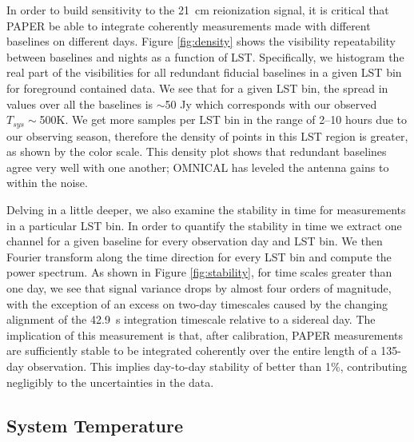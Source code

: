 \documentclass[twocolumn,numberedappendix]{emulateapj} \shorttitle{New Limits on the 21 cm Power Spectrum at $z=8.4$}
\begin{document}
In order to build sensitivity to the 21~cm reionization signal, it is critical
that PAPER be able to integrate coherently measurements made with different baselines on different days.
Figure \ref{fig:density} shows the visibility repeatability between 
baselines and nights as a function of LST. Specifically, we histogram the real part of
the visibilities for all redundant fiducial baselines 
in a given LST bin for foreground contained data. We see that for a
given LST bin, the spread in values over all the baselines is $\sim$50 Jy which corresponds with our observed
$T_{sys}\sim$500K.  We get
more samples per LST bin in the range of 2--10 hours due to our observing
season, therefore the density of points in this LST region is greater, as shown by
the color scale. This density plot shows that redundant baselines agree very well
with one another; OMNICAL has leveled the antenna gains to within the noise.

Delving in a little deeper, we also examine the
stability in time for measurements in a particular LST bin. In order to quantify the stability
in time we extract one channel for a given baseline for every observation day
and LST bin. We then Fourier transform along the time direction for every LST
bin and compute the power spectrum. As shown in Figure \ref{fig:stability},
for time scales greater than one day, we see that signal variance drops by
almost four orders of magnitude, 
with the exception of an 
excess on two-day timescales caused by the changing alignment of the 42.9~s
integration timescale relative to a sidereal day.  The implication of this
measurement is that, after calibration, PAPER measurements are sufficiently
stable to be integrated coherently over the entire length of a 135-day
observation. This implies day-to-day stability of better than 1\%, contributing
negligibly to the uncertainties in the data.

\subsection{System Temperature}   
\end{document}
